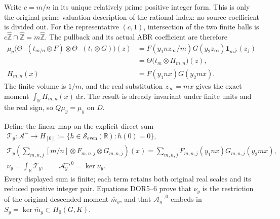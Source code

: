 Write $c=m/n$ in its unique relatively prime positive integer form.
This is only the original prime-valuation description of the rational
index: no source coefficient is divided out. For the representative
$(c,1)$, intersection of the two finite balls is
$c\widehat{\mathbb Z}\cap\widehat{\mathbb Z}
=m\widehat{\mathbb Z}$. The pullback and its actual ABR coefficient
are therefore
\begin{equation}\tag{DOR6}
\begin{split}
\mu_y\bigl(\Theta_-(t_{m/n}\otimes F)
                      \otimes\Theta_-(t_1\otimes G)\bigr)(z)
 &=F(y_1nz_\infty/m)G(y_2z_\infty)
                                  \mathbf1_{m\widehat{\mathbb Z}}(z_f)\\
 &=\Theta\bigl(t_m\otimes H_{m,n}\bigr)(z),\\
H_{m,n}(x)&=F(y_1nx)G(y_2mx).
\end{split}
\end{equation}
The finite volume is $1/m$, and the real substitution $z_\infty=mx$
gives the exact moment $\int_{\mathbb R}H_{m,n}(x)\,dx$.
The result is already invariant under finite units and the real
sign, so $Q\mu_y=\mu_y$ on $D$.

Define the linear map on the explicit direct sum
\begin{equation}\tag{DOR7}
\begin{gathered}
\mathcal T_y:\mathcal A^-\longrightarrow
 H_{[0]}:=\{h\in\mathcal S_{\mathrm{even}}(\mathbb R):h(0)=0\},\\
\mathcal T_y\left(\sum_{m,n,j}[m/n]\otimes F_{m,n,j}\otimes G_{m,n,j}\right)(x)
 =\sum_{m,n,j}F_{m,n,j}(y_1nx)G_{m,n,j}(y_2mx),\\
\nu_y=\int_{\mathbb R}\mathcal T_y,\qquad
\mathcal A_y^{-,0}=\ker\nu_y.
\end{gathered}
\end{equation}
Every displayed sum is finite; each term retains both original real
scales and its reduced positive integer pair. Equations DOR5--6
prove that $\nu_y$ is the restriction of the original descended
moment $\overline m_y$, and that $\mathcal A_y^{-,0}$ embeds in
$S_y=\ker\overline m_y\subset H_0(G,K)$.

